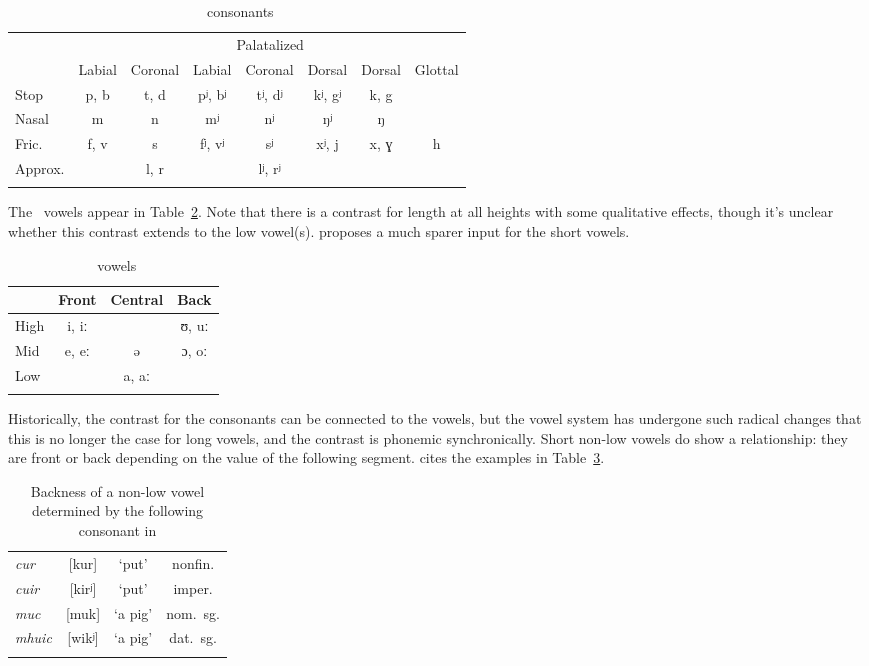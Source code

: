 \documentclass[output=paper,colorlinks,citecolor=brown]{langscibook}
\begin{document}
\begin{table}
\caption{\ir\ consonants}
\label{ir.consonants.tab}
\begin{tabular}{lccccccc}
\lsptoprule
        &  &  & \multicolumn{3}{c}{Palatalized}  &   &  \\\cmidrule(lr){4-6}
        & Labial & Coronal & Labial  & Coronal & Dorsal  & Dorsal & Glottal\\
\midrule
Stop    & p, b & t, d & pʲ, bʲ  & tʲ, dʲ & kʲ, gʲ   & k, g       & \\
Nasal   & m    & n    & mʲ      & nʲ     & ŋʲ       & ŋ          & \\
Fric.   & f, v & s    & fʲ, vʲ  & sʲ     & xʲ, j    & x, ɣ       & h \\
Approx. &      & l, r &         & lʲ, rʲ &          &            & \\
\lspbottomrule
\end{tabular}
\end{table}

The \ir\ vowels appear in Table~\ref{ir.vowels.tab}. Note that there is a contrast for length at all heights with some qualitative effects, though it's unclear whether this contrast extends to the low vowel(s). \citet{ni.chiosain.diss} proposes a much sparer input  for the short vowels.

\begin{table}
\caption{\ir\ vowels}
\label{ir.vowels.tab}
\begin{tabular}{lccc}
\lsptoprule
     & Front & Central & Back \\
\midrule
High & i, iː &         & ʊ, uː \\
Mid  & e, eː & ə       & ɔ, oː \\
Low  &       & a, aː   & \\
\lspbottomrule
\end{tabular}
\end{table}

Historically, the  contrast for the consonants can be connected to the vowels, but the vowel system has undergone such radical changes that this is no longer the case for long vowels, and the contrast is phonemic synchronically. Short non-low vowels do show a relationship: they are front or back depending on the  value of the following segment. \citet[141]{ni.chiosain.diss} cites the examples in Table~\ref{ir.shortvowels.tab}.

\begin{table}
\caption{Backness of a non-low vowel determined by the following consonant in \ir}
\label{ir.shortvowels.tab}
\begin{tabular}{>{\itshape}lccc}
\lsptoprule
cur   & [kur]  & `put'   & nonfin. \\
cuir  & [kirʲ] & `put'   & imper. \\
muc   & [muk]  & `a pig' & nom.\ sg. \\
mhuic & [wikʲ] & `a pig' & dat.\ sg. \\
\lspbottomrule
\end{tabular}
\end{table}
\end{document}
